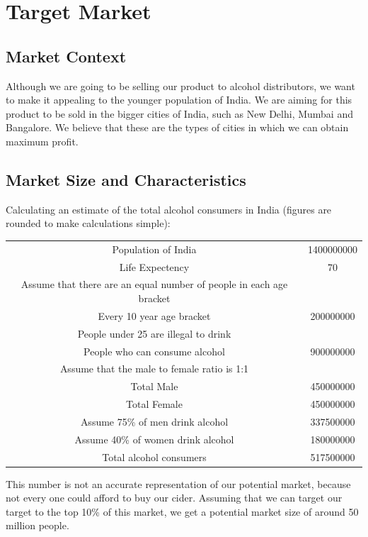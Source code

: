 \documentclass[11pt]{article}
\begin{document}
\section{Target Market}
  \subsection{Market Context}
Although we are going to be selling our product to alcohol distributors, we want
to make it appealing to the younger population of India. We are aiming for this
product to be sold in the bigger cities of India, such as New Delhi, Mumbai and
Bangalore. We believe that these are the types of cities in which we can
obtain maximum profit.

  \subsection{Market Size and Characteristics}
Calculating an estimate of the total alcohol consumers in India (figures are
rounded to make calculations simple):

		\begin{center}
			\begin{tabular}{ | c | c | } \hline
				Population of India & 1400000000 \\
				Life Expectency & 70 \\
				Assume that there are an equal number of people in each age bracket & \\
				Every 10 year age bracket & 200000000 \\
				People under 25 are illegal to drink & \\
				People who can consume alcohol & 900000000 \\
				Assume that the male to female ratio is 1:1 & \\
				Total Male & 450000000 \\
				Total Female & 450000000 \\
				Assume 75\% of men drink alcohol & 337500000 \\
				Assume 40\% of women drink alcohol & 180000000 \\
				Total alcohol consumers & 517500000 \\ \hline
			\end{tabular}
		\end{center}

This number is not an accurate representation of our potential market, because
not every one could afford to buy our cider. Assuming that we can target our
target to the top 10\% of this market, we get a potential market size of around
50 million people.
\end{document}
